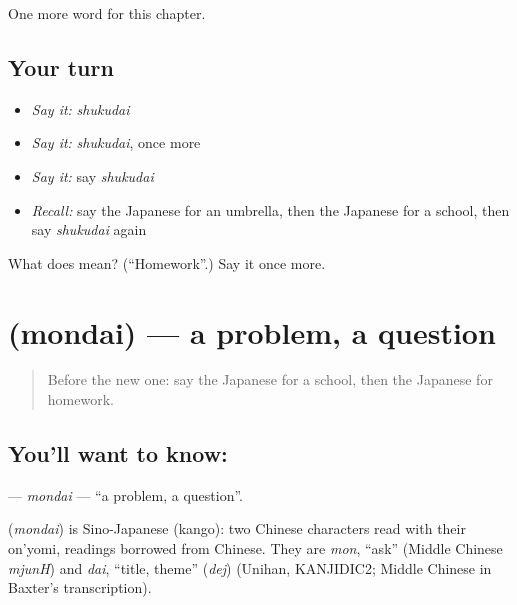 \begin{grammarlens}[title={What you've built}]
One more word for this chapter.
\end{grammarlens}

\subsection*{Your turn}
\begin{itemize}
\raggedright
  \item \emph{Say it:} \emph{shukudai}
  \item \emph{Say it:} \emph{shukudai}, once more
  \item \emph{Say it:} say \emph{shukudai}
  \item \emph{Recall:} say the Japanese for an umbrella, then the Japanese for a school, then say \emph{shukudai} again
\end{itemize}

\begin{tcolorbox}[breakable,colback=teal!4,colframe=teal!35!black,title={Before you move on}]
What does  mean? (\textquotedblleft{}Homework\textquotedblright{}.) Say it once more.
\end{tcolorbox}
\section[\texorpdfstring{\ja{もんだい} (mondai)}{もんだい (mondai)}]{ (mondai) — a problem, a question}

\label{lesson:JA-C40-mondai}



\begin{quote}
Before the new one: say the Japanese for a school, then the Japanese for homework.
\end{quote}

\subsection*{You'll want to know: }
\textbf{} — \emph{mondai} — \textquotedblleft{}a problem, a question\textquotedblright{}.

\begin{cousinweb}
\textbf{} (\emph{mondai}) is Sino-Japanese (kango): two Chinese characters read with their on'yomi, readings borrowed from Chinese. They are \emph{mon}, \textquotedblleft{}ask\textquotedblright{} (Middle Chinese \emph{mjunH}) and \emph{dai}, \textquotedblleft{}title, theme\textquotedblright{} (\emph{dej}) (Unihan, KANJIDIC2; Middle Chinese in Baxter's transcription).
\end{cousinweb}


